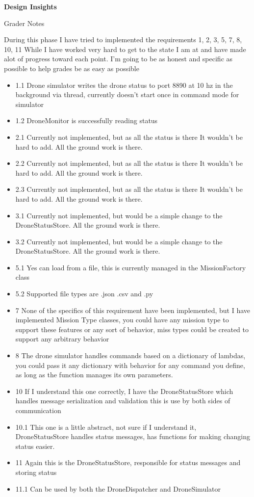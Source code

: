 \documentclass[12pt]{article}
\begin{document}
\begingroup
      \fontsize{14pt}{12pt}\selectfont

      \centerline{\textbf{Design Insights}} \par
\endgroup

Grader Notes

During this phase I have tried to implemented the requirements 1, 2, 3, 5, 7, 8, 10, 11
While I have worked very hard to get to the state I am at and have made alot of progress toward each point.
I'm going to be as honest and specific as possible to help grades be as easy as possible

\begin{itemize}
    \item 1.1 Drone simulator writes the drone status to port 8890 at 10 hz in the background via thread, currently doesn't start once in command mode for simulator
    \item 1.2 DroneMonitor is successfully reading status 
    \item 2.1 Currently not implemented, but as all the status is there It wouldn't be hard to add. All the ground work is there.
    \item 2.2 Currently not implemented, but as all the status is there It wouldn't be hard to add. All the ground work is there.
    \item 2.3 Currently not implemented, but as all the status is there It wouldn't be hard to add. All the ground work is there.
    \item 3.1 Currently not implemented, but would be a simple change to the DroneStatusStore. All the ground work is there.
    \item 3.2 Currently not implemented, but would be a simple change to the DroneStatusStore. All the ground work is there.
    \item 5.1 Yes can load from a file, this is currently managed in the MissionFactory class
    \item 5.2 Supported file types are .json .csv and .py
    \item 7 None of the specifics of this requirement have been implemented, but I have implemented Mission Type classes, you could have any mission type to support these features or any sort of behavior, 
     miss  types could be created to support any arbitrary behavior
    \item 8 The drone simulator handles commands based on a dictionary of lambdas, you could pass it any dictionary
    with behavior for any command you define, as long as the function manages its own parameters.
    \item 10 If I understand this one correctly, I have the DroneStatusStore which handles message serialization and validation this is use by both sides of communication
    \item 10.1 This one is a little abstract, not sure if I understand it, DroneStatusStore handles status messages, has functions for making changing status easier.
    \item 11 Again this is the DroneStatusStore, responsible for status messages and storing status
    \item 11.1 Can be used by both the DroneDispatcher and DroneSimulator
\end{itemize}
\end{document}
